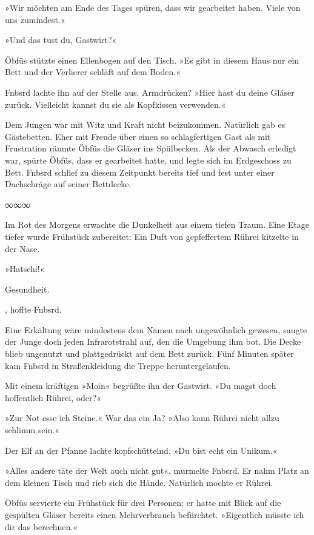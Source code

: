 »Wir möchten am Ende des Tages spüren, dass wir gearbeitet haben. Viele von uns zumindest.«

»Und das tust du, Gastwirt?«

Öbfüs stützte einen Ellenbogen auf den Tisch. »Es gibt in diesem Haus nur ein Bett und der Verlierer schläft auf dem Boden.«

Fnbsrd lachte ihn auf der Stelle aus. Armdrücken? »Hier hast du deine Gläser zurück. Vielleicht kannst du sie als Kopfkissen verwenden.«

Dem Jungen war mit Witz und Kraft nicht beizukommen. Natürlich gab es Gästebetten. Eher mit Freude über einen so schlagfertigen Gast als mit Frustration räumte Öbfüs die Gläser ins Spülbecken. Als der Abwasch erledigt war, spürte Öbfüs, dass er gearbeitet hatte, und legte sich im Erdgeschoss zu Bett. Fnbsrd schlief zu diesem Zeitpunkt bereits tief und fest unter einer Dachschräge auf seiner Bettdecke.

\begin{center}
∞∞∞
\end{center}

Im Rot des Morgens erwachte die Dunkelheit aus einem tiefen Traum. Eine Etage tiefer wurde Frühstück zubereitet: Ein Duft von gepfeffertem Rührei kitzelte in der Nase.

»Hatschi!«

Gesundheit.

, hoffte Fnbsrd. 

Eine Erkältung wäre mindestens dem Namen nach ungewöhnlich gewesen, saugte der Junge doch jeden Infrarotstrahl auf, den die Umgebung ihm bot. Die Decke blieb ungenutzt und plattgedrückt auf dem Bett zurück. Fünf Minuten später kam Fnbsrd in Straßenkleidung die Treppe heruntergelaufen.

Mit einem kräftigen »Moin« begrüßte ihn der Gastwirt. »Du magst doch hoffentlich Rührei, oder?«

»Zur Not esse ich Steine.« War das ein Ja? »Also kann Rührei nicht allzu schlimm sein.«

Der Elf an der Pfanne lachte kopfschüttelnd. »Du bist echt ein Unikum.«

»Alles andere täte der Welt auch nicht gut«, murmelte Fnbsrd. Er nahm Platz an dem kleinen Tisch und rieb sich die Hände. Natürlich mochte er Rührei.

Öbfüs servierte ein Frühstück für drei Personen; er hatte mit Blick auf die gespülten Gläser bereits einen Mehrverbrauch befürchtet. »Eigentlich müsste ich dir das berechnen.«

